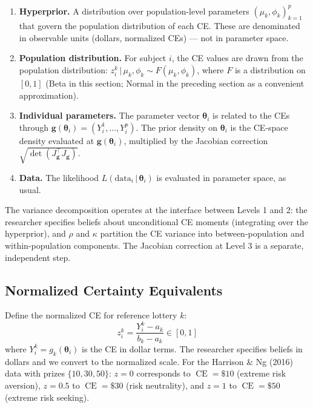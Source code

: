\documentclass[11pt,a4paper]{article}
\theoremstyle{definition}
\newcommand{\given}{\,|\,}
\newcommand{\btheta}{\boldsymbol{\theta}}
\DeclareMathOperator{\CE}{CE}
\begin{document}
\begin{enumerate}
    \item[\textbf{Level 1.}] \textbf{Hyperprior.} A distribution over
    population-level parameters $(\mu_k, \phi_k)_{k=1}^p$ that govern the
    population distribution of each CE. These are denominated in observable
    units (dollars, normalized CEs) --- not in parameter space.

    \item[\textbf{Level 2.}] \textbf{Population distribution.} For subject
    $i$, the CE values are drawn from the population distribution:
    $z_i^k \given \mu_k, \phi_k \sim F(\mu_k, \phi_k)$, where $F$ is
    a distribution on $[0,1]$ (Beta in this section; Normal in the
    preceding section as a convenient approximation).

    \item[\textbf{Level 3.}] \textbf{Individual parameters.} The
    parameter vector $\btheta_i$ is related to the CEs through
    $\mathbf{g}(\btheta_i) = (Y_i^1, \ldots, Y_i^p)$. The prior density on
    $\btheta_i$ is the CE-space density evaluated at $\mathbf{g}(\btheta_i)$,
    multiplied by the Jacobian correction
    $\sqrt{\det(J_{\mathbf{g}}^\top J_{\mathbf{g}})}$.

    \item[\textbf{Level 4.}] \textbf{Data.} The likelihood
    $L(\text{data}_i \given \btheta_i)$ is evaluated in parameter space, as
    usual.
\end{enumerate}

\noindent
The variance decomposition operates at the interface between Levels 1 and 2:
the researcher specifies beliefs about unconditional CE moments (integrating
over the hyperprior), and $\rho$ and $\kappa$ partition the CE variance into
between-population and within-population components. The Jacobian correction
at Level 3 is a separate, independent step.

\subsection{Normalized Certainty Equivalents}

Define the normalized CE for reference lottery $k$:
\begin{equation}
    z_i^k = \frac{Y_i^k - a_k}{b_k - a_k} \in [0, 1]
\end{equation}
where $Y_i^k = g_k(\btheta_i)$ is the CE in dollar terms. The researcher
specifies beliefs in dollars and we convert to the normalized scale. For the
Harrison \& Ng (2016) data with prizes $\{10, 30, 50\}$: $z = 0$ corresponds
to $\CE = \$10$ (extreme risk aversion), $z = 0.5$ to $\CE = \$30$ (risk
neutrality), and $z = 1$ to $\CE = \$50$ (extreme risk seeking).
\end{document}
